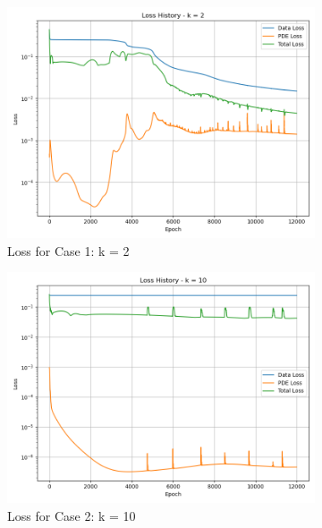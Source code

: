 \documentclass[11pt]{article}
\begin{document}
\begin{figure}[h!]
    \centering
    \begin{subfigure}[b]{0.48\textwidth}
        \includegraphics[width=\textwidth]{2D_Loss_K1_Rowdy.png}
        \caption{Loss for Case 1: k = 2}
        \label{fig:Loss_K1_Rowdy}
    \end{subfigure}
    \hfill
    \begin{subfigure}[b]{0.48\textwidth}
        \includegraphics[width=\textwidth]{2D_Loss_K2_Rowdy.png}
        \caption{Loss for Case 2: k = 10}
        \label{fig:Loss_K2_Rowdy}
    \end{subfigure}
    \hfill
    \begin{subfigure}[b]{0.48\textwidth}

\end{subfigure}
\end{figure}
\end{document}
